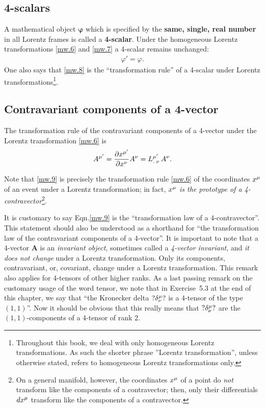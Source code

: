 \subsection{4-scalars}
\dfnb  A mathematical object $\mathbf{\varphi}$ which 
is specified by the \textbf{same, single,  real number} 
in all Lorentz frames is called a \textbf{4-scalar}. 
Under the homogeneous Lorentz transformations 
\eqref{mw.6} and \eqref{mw.7} a 4-scalar remains 
unchanged:
\begin{align}\label{mw.8}\mathbb{}
\varphi'=\varphi.
\end{align}
One also says that \eqref{mw.8} is the ``transformation 
rule'' of a 4-scalar under Lorentz 
transformations\footnote{Throughout this book, we 
 deal with only homogeneous Lorentz transformations. 
As such the shorter phrase ''Lorentz transformation'', 
unless otherwise stated, refers to  homogeneous 
Lorentz transformations only.}.

\subsection{Contravariant components of a  
4-vector} 
The  transformation rule of the contravariant 
components of a 4-vector under the Lorentz 
transformation \eqref{mw.6} is
\begin{align}\label{mw.9}
A^{{\mu'}}= \frac{{\partial} x^{{\mu'}}}
{{\partial} x^{{\nu}}}A^{{\nu}}= 
{{L}^{{\mu'}}_{.\;{\nu}}}\,A^{{\nu}}.
\end{align}

\newpage

Note that \eqref{mw.9} is precisely the transformation 
rule \eqref{mw.6} of the coordinates $x^{{\mu}}$ of an 
event under a Lorentz transformation; in fact, 
\textsl{$x^{{\mu}}$ is the prototype of a 
4-contravector}\footnote{On a general manifold, 
however, the coordinates $x^{{\mu}}$ of a point do 
\textit{not} transform like the components of a 
contravector; then, only their differentials $dx^{{\mu}}$ 
transform like the components of a contravector.}.

It is customary to say Eqn.\eqref{mw.9} is the 
``transformation law of a 4-contravector''. This statement  
should also be understood as a shorthand for ``the 
transformation law of the contravariant components of a 
4-vector''. It is important to note that a 4-vector 
$\mathbf{A}$ is an \textit{invariant object}, 
sometimes called a \textit{4-vector invariant}, and 
\textit{it does not change} under a Lorentz transformation. 
Only its components, contravariant, or, 
covariant, change under a Lorentz transformation. This 
remark also applies for 4-tensors of other higher ranks. As 
a last passing remark on the customary usage of the word 
tensor, we note that in Exercise~5.3 at the end of this 
chapter, we say that ``the Kronecker delta 
$?\delta^{{\mu}}_{{\nu}}? $ is a 4-tensor of the type $ (1,1) 
$''. Now it should be obvious that this really means that  
$?\delta^{{\mu}}_{{\nu}}?$ are the $(1,1)$-components of a 
4-tensor of  rank 2.


